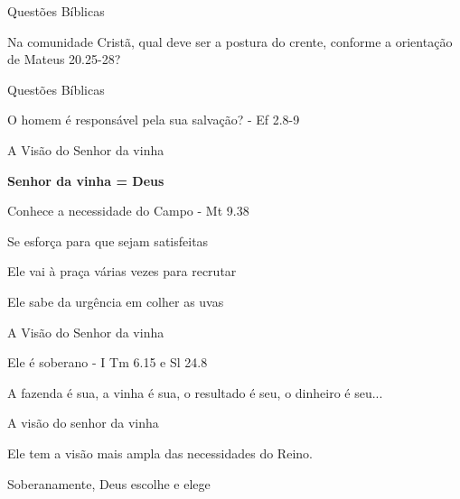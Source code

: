\documentclass[compress]{beamer}
\begin{document}
\begin{frame}{Questões Bíblicas}

\begin{itemize}
{\huge\item[•] Na comunidade Cristã, qual deve ser a postura do crente, conforme a orientação de Mateus 20.25-28?}
\end{itemize}
\end{frame}

\begin{frame}{Questões Bíblicas}

\begin{itemize}
{\Huge \item[•] O homem é responsável pela sua salvação?
\pause
 - Ef 2.8-9}
\end{itemize}
\end{frame}
\begin{frame}{A Visão do Senhor da vinha}
\begin{itemize}
{\Huge \item[•] \textbf{Senhor da vinha = Deus}}
\begin{itemize}
{\huge \item[•] Conhece a necessidade do Campo - Mt 9.38
\pause
\item[•] Se esforça para que sejam satisfeitas
\pause
\item[•] Ele vai à praça várias vezes para recrutar
\pause
\item[•] Ele sabe da urgência em colher as uvas}
\end{itemize}
\end{itemize}
\end{frame}

\begin{frame}{A Visão do Senhor da vinha}
\begin{itemize}
{\Huge \item[•] Ele é soberano - I Tm 6.15 e Sl 24.8
\pause
\item[•] A fazenda é sua, a vinha é sua, o resultado é seu, o dinheiro é seu...}
\end{itemize}
\end{frame}

\begin{frame}{A visão do senhor da vinha}
\begin{itemize}
{\Huge \item[•] Ele tem a visão mais ampla das necessidades do Reino.
\pause
\item[•] Soberanamente, Deus escolhe e elege}
\end{itemize}
\end{frame}
\end{document}
